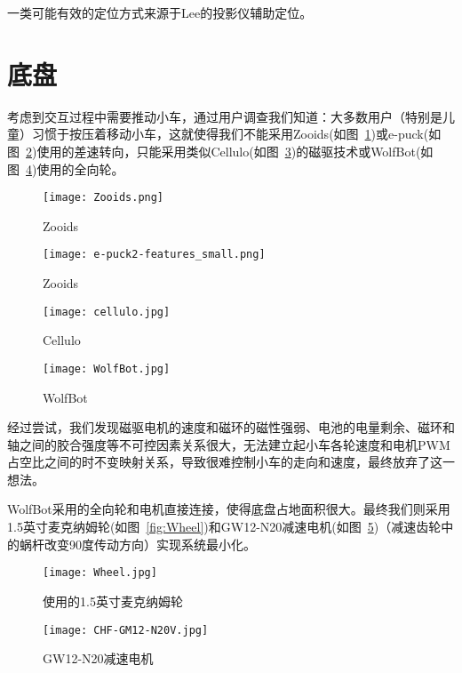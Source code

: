 
一类可能有效的定位方式来源于Lee\cite{lee2005moveable}的投影仪辅助定位。


\section{底盘}
考虑到交互过程中需要推动小车，通过用户调查我们知道：大多数用户（特别是儿童）习惯于按压着移动小车，这就使得我们不能采用Zooids\cite{le2016zooids}(如图~\ref{fig:Zooids})或e-puck\cite{mondada2009puck}(如图~\ref{fig:e-puck})使用的差速转向，只能采用类似Cellulo\cite{ozgur2017cellulo}(如图~\ref{fig:Cellulo})的磁驱技术或WolfBot\cite{betthauser2014wolfbot}(如图~\ref{fig:WolfBot})使用的全向轮。

\begin{figure}[htbp]
    \centering
    \texttt{[image: Zooids.png]}
    \caption{Zooids}
    \label{fig:Zooids}
\end{figure}

\begin{figure}[htbp]
    \centering
    \texttt{[image: e-puck2-features\_small.png]}
    \caption{Zooids}
    \label{fig:e-puck}
\end{figure}

\begin{figure}[htbp]
    \centering
    \texttt{[image: cellulo.jpg]}
    \caption{Cellulo}
    \label{fig:Cellulo}
\end{figure}
  
\begin{figure}[htbp]
    \centering
    \texttt{[image: WolfBot.jpg]}
    \caption{WolfBot}
    \label{fig:WolfBot}
\end{figure}

经过尝试，我们发现磁驱电机的速度和磁环的磁性强弱、电池的电量剩余、磁环和轴之间的胶合强度等不可控因素关系很大，无法建立起小车各轮速度和电机PWM占空比之间的时不变映射关系，导致很难控制小车的走向和速度，最终放弃了这一想法。

WolfBot采用的全向轮和电机直接连接，使得底盘占地面积很大。最终我们则采用1.5英寸麦克纳姆轮(如图~\ref{fig:Wheel})和GW12-N20减速电机(如图~\ref{fig:GM12})（减速齿轮中的蜗杆改变90度传动方向）实现系统最小化。

\begin{figure}
    \begin{minipage}{0.48\textwidth}
      \centering
      \texttt{[image: Wheel.jpg]}
      \caption{使用的1.5英寸麦克纳姆轮}
      \label{fig:Wheel}
    \end{minipage}\hfill
    \begin{minipage}{0.48\textwidth}
      \centering
      \texttt{[image: CHF-GM12-N20V.jpg]}
      \caption{GW12-N20减速电机}
      \label{fig:GM12}
    \end{minipage}
\end{figure}


